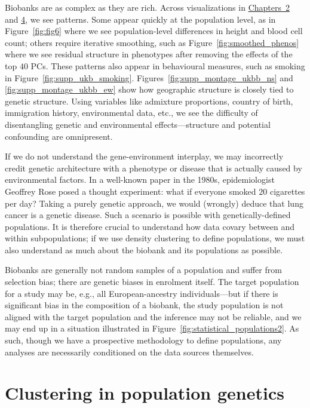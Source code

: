 Biobanks are as complex as they are rich. Across visualizations in \hyperref[chap:chapter2]{Chapters~2} and \hyperref[chap:chapter4]{4}, we see patterns. Some appear quickly at the population level, as in Figure~\ref{fig:fig6} where we see population-level differences in height and blood cell count; others require iterative smoothing, such as  Figure~\ref{fig:smoothed_phenos} where we see residual structure in phenotypes after removing the effects of the top $40$ PCs. These patterns also appear in behavioural measures, such as smoking in Figure~\ref{fig:supp_ukb_smoking}. Figures~\ref{fig:supp_montage_ukbb_ns} and \ref{fig:supp_montage_ukbb_ew} show how geographic structure is closely tied to genetic structure. Using variables like admixture proportions, country of birth, immigration history, environmental data, etc., we see the difficulty of disentangling genetic and environmental effects---structure and potential confounding are omnipresent.

If we do not understand the gene-environment interplay, we may incorrectly credit genetic architecture with a phenotype or disease that is actually caused by environmental factors. In a well-known paper in the 1980s\citep{rose_sick_2001}, epidemiologist Geoffrey Rose posed a thought experiment: what if everyone smoked $20$ cigarettes per day? Taking a purely genetic approach, we would (wrongly) deduce that lung cancer is a genetic disease. Such a scenario is possible with genetically-defined populations. It is therefore crucial to understand how data covary between and within subpopulations; if we use density clustering to define populations, we must also understand as much about the biobank and its populations as possible.

Biobanks are generally not random samples of a population and suffer from selection bias\citep{huang_representativeness_2021}; there are genetic biases in enrolment itself\citep{pirastu_genetic_2021,benonisdottir_studying_2023}. The target population for a study may be, e.g., all European-ancestry individuals---but if there is significant bias in the composition of a biobank, the study population is not aligned with the target population and the inference may not be reliable, and we may end up in a situation illustrated in Figure~\ref{fig:statistical_populations2}. As such, though we have a prospective methodology to define populations, any analyses are necessarily conditioned on the data sources themselves.

\section{Clustering in population genetics}

